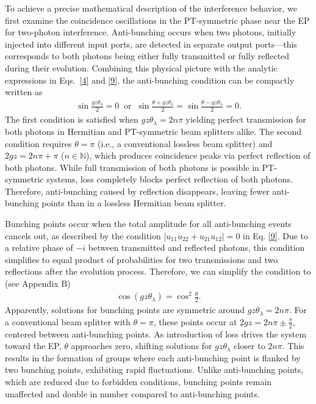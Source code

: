 \documentclass[%
reprint,
superscriptaddress,
amsthm,amsmath,amssymb,
aps,
]{revtex4-1}
\begin{document}
To achieve a precise mathematical description of the interference behavior, we first examine the coincidence oscillations in the PT-symmetric phase near the EP for two-photon interference. Anti-bunching occurs when two photons, initially injected into different input ports, are detected in separate output ports—this corresponds to both photons being either fully transmitted or fully reflected during their evolution. Combining this physical picture with the analytic expressions in Eqs.~\ref{4} and \ref{9}, the anti-bunching condition can be compactly written as  
\begin{eqnarray}
	\sin \frac{gz\theta_{\lambda }}{2}=0 \label{12} \; \; \text{or} \; \; \sin \frac{\theta+gz\theta_{\lambda}}{2}=\sin \frac{\theta-gz\theta_{\lambda}}{2}=0\label{13} .
\end{eqnarray}
The first condition is satisfied when $gz\theta_{\lambda}=2n\pi$ yielding perfect transmission for both photons in Hermitian and PT-symmetric beam splitters alike. The second condition requires $\theta=\pi$ (i.e., a conventional lossless beam splitter) and $2gz=2n\pi+\pi$ ($n\in\mathbb{N}$), which produces coincidence peaks via perfect reflection of both photons. While full transmission of both photons is possible in PT-symmetric systems, loss completely blocks perfect reflection of both photons. Therefore, anti-bunching caused by reflection disappears, leaving fewer anti-bunching points than in a lossless Hermitian beam splitter.

Bunching points occur when the total amplitude for all anti-bunching events cancels out, as described by the condition $\left| u_{11} u_{22} + u_{21} u_{12} \right|=0$ in Eq. \ref{9}. Due to a relative phase of $-i$ between transmitted and reflected photons, this condition simplifies to equal product of probabilities for two transmissions and two reflections after the evolution process. Therefore, we can simplify the condition to (see Appendix B)
\begin{eqnarray}
	\cos(gz \theta_{\lambda})=\cos^{2} \frac{\theta}{2}\label{15}.
\end{eqnarray}
Apparently, solutions for bunching points are symmetric around $gz\theta_{\lambda}=2n\pi$. For a conventional beam splitter with $\theta=\pi$, these points occur at $2gz=2n\pi\pm\frac{\pi}{2}$, centered between anti-bunching points. As introduction of loss drives the system toward the EP, $\theta$ approaches zero, shifting solutions for $gz\theta_{\lambda}$ closer to $2n\pi$. This results in the formation of groups where each anti-bunching point is flanked by two bunching points, exhibiting rapid fluctuations. Unlike anti-bunching points, which are reduced due to forbidden conditions, bunching points remain unaffected and double in number compared to anti-bunching points.
\end{document}

